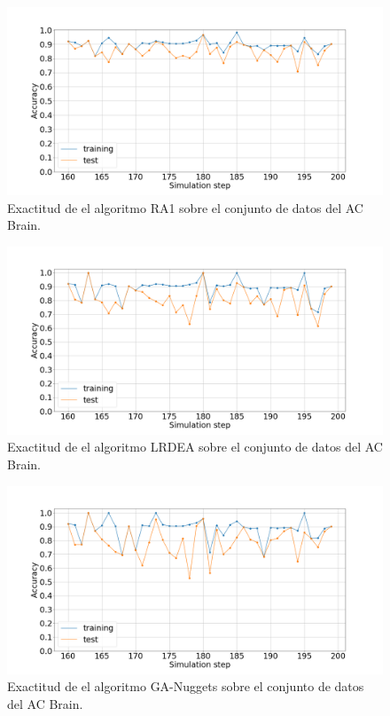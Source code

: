 	\begin{figure}[H]
		\centering
		\includegraphics[width=\linewidth]{fig/ra1_0}
		\caption{Exactitud de el algoritmo RA1 sobre el conjunto de datos del AC Brain.}
		\label{fig:ra1brain}
	\end{figure}

	\begin{figure}[H]
		\centering
		\includegraphics[width=\linewidth]{fig/LRDEA_1}
		\caption{Exactitud de el algoritmo LRDEA sobre el conjunto de datos del AC Brain.}
		\label{fig:lrdeabrain}
	\end{figure}

	\begin{figure}[H]
		\centering
		\includegraphics[width=\linewidth]{fig/GA-nuggets_2}
		\caption{Exactitud de el algoritmo GA-Nuggets sobre el conjunto de datos del AC Brain.}
		\label{fig:ganuggetsabrain}
	\end{figure}

